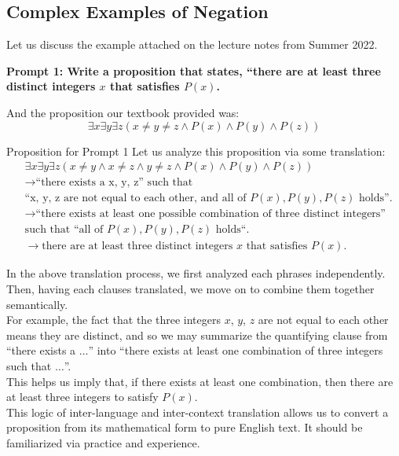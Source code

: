 \subsection{Complex Examples of Negation}
Let us discuss the example attached on the lecture notes from Summer 2022.
\begin{center}
    \textbf{Prompt 1: Write a proposition that states, ``there are at least three distinct integers $x$ that satisfies $P(x)$.}
\end{center}
And the proposition our textbook provided was:
\[\exists x \exists y \exists z (x \neq y \neq z \land P(x) \land P(y) \land P(z))\]
\begin{ln-think}{Proposition for Prompt 1}{}
    Let us analyze this proposition via some translation:
    \begin{align*}
        &\exists x \exists y \exists z (x \neq y \land x \neq z \land y \neq z \land P(x) \land P(y) \land P(z)) \\
        &\rightarrow \text{``there exists a x, y, z'' such that} \\
        & \text{``x, y, z are not equal to each other, and all of $P(x), P(y), P(z)$ holds''.} \\
        &\rightarrow \text{``there exists at least one possible combination of three distinct integers''} \\
        & \text{such that ``all of $P(x), P(y), P(z)$ holds``.} \\
        &\rightarrow \text{there are at least three distinct integers $x$ that satisfies $P(x)$.}
    \end{align*}
\end{ln-think}
In the above translation process, we first analyzed each phrases independently. Then, having each clauses translated, we move on to combine them together semantically. \\
For example, the fact that the three integers $x$, $y$, $z$ are not equal to each other means they are distinct, and so we may summarize the quantifying clause from ``there exists a $\dots$'' into ``there exists at least one combination of three integers such that $\dots$''. \\
This helps us imply that, if there exists at least one combination, then there are at least three integers to satisfy $P(x)$. \\
This logic of inter-language and inter-context translation allows us to convert a proposition from its mathematical form to pure English text. It should be familiarized via practice and experience. \\
